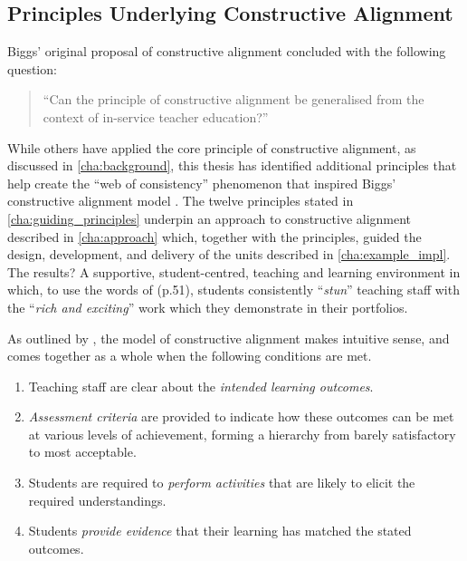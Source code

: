 \subsection{Principles Underlying Constructive Alignment} %
\label{sub:principles_underlying_constructive_alignment}


Biggs' original proposal of constructive alignment concluded with the following question:

\begin{quote}
	``Can the principle of constructive alignment be generalised from the context of in-service teacher education?'' \citet{Biggs:1996c}
\end{quote}

While others have applied the core principle of constructive alignment, as discussed in \cref{cha:background}, this thesis has identified additional principles that help create the ``web of consistency'' phenomenon that inspired Biggs' constructive alignment model \citep{Biggs:1996c,Biggs:1999}. The twelve principles stated in \cref{cha:guiding_principles} underpin an approach to constructive alignment described in \cref{cha:approach} which, together with the principles, guided the design, development, and delivery of the units described in \cref{cha:example_impl}. The results? A supportive, student-centred, teaching and learning environment in which, to use the words of \citet{Biggs:2007} (p.51), students consistently ``\emph{stun}'' teaching staff with the ``\emph{rich and exciting}'' work which they demonstrate in their portfolios.

As outlined by \citet{Biggs:1996c}, the model of constructive alignment makes intuitive sense, and comes together as a whole when the following conditions are met.
\begin{enumerate}
	\item Teaching staff are clear about the \emph{intended learning outcomes}.
	\item \emph{Assessment criteria} are provided to indicate how these outcomes can be met at various levels of achievement, forming a hierarchy from barely satisfactory to most acceptable.
	\item Students are required to \emph{perform activities} that are likely to elicit the required understandings.
	\item Students \emph{provide evidence} that their learning has matched the stated outcomes.
\end{enumerate}

